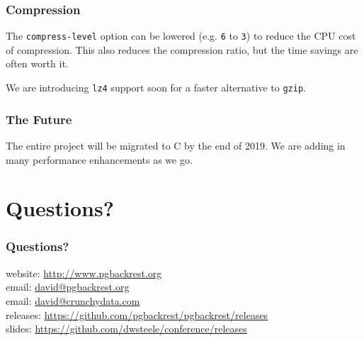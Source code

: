 \begin{frame}
    \frametitle{Compression}

    The \texttt{compress-level} option can be lowered (e.g. \texttt{6} to \texttt{3}) to reduce the CPU cost of compression. This also reduces the compression ratio, but the time savings are often worth it.\pause

    \vspace{1em}We are introducing \texttt{lz4} support soon for a faster alternative to \texttt{gzip}.
\end{frame}

\begin{frame}
    \frametitle{The Future}

    The entire project will be migrated to C by the end of 2019.  We are adding in many performance enhancements as we go.
\end{frame}

\section{Questions?}

\begin{frame}
    \frametitle{Questions?}

    website: \url{http://www.pgbackrest.org}\\
    \vspace{1em}
    email: \href{mailto:david@pgbackrest.org}{david@pgbackrest.org} \\
    email: \href{mailto:david@crunchydata.com}{david@crunchydata.com}\\
    \vspace{1em}
    releases: \url{https://github.com/pgbackrest/pgbackrest/releases}\\
    \vspace{1em}
    slides: \url{https://github.com/dwsteele/conference/releases}\\
\end{frame}



